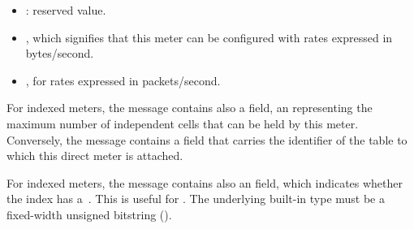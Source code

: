 \documentclass[11pt]{article}
\begin{document}
{\begin{itemize}
\begin{itemize}[noitemsep,topsep=\mdcompacttopsep]%

\item{}: reserved value.%

\item{}, which signifies that this meter can be configured with rates
expressed in bytes/second.%

\item{}, for rates expressed in packets/second.%
\end{itemize}%
\end{itemize}%

\noindent{}For indexed meters, the  message contains also a  field, an 
representing the maximum number of independent cells that can be held by this
meter. Conversely, the  message contains a  field
that carries the  identifier of the table to which this direct meter is
attached.%

For indexed meters, the  message contains also an 
field, which indicates whether the index has a~. This is useful for
. The underlying built-in type must
be a fixed-width unsigned bitstring ().%

}
\end{document}
